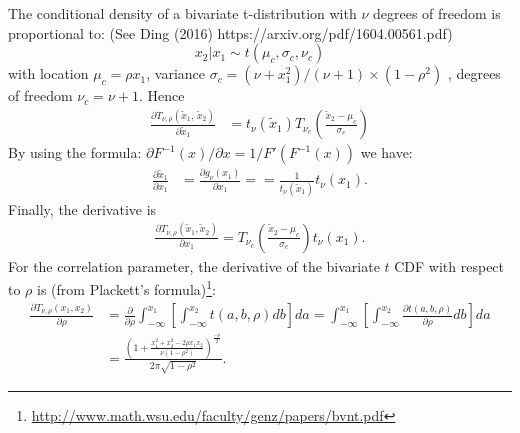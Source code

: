 \documentclass[a4paper,fleqn]{article}
\begin{document}
The conditional density of a bivariate t-distribution with $\nu$ degrees of freedom is proportional to: (See Ding (2016) https://arxiv.org/pdf/1604.00561.pdf)
$$ x_2|x_1 \sim t(\mu_c, \sigma_c , \nu_c)$$
with location $\mu_c = \rho x_1$, variance $\sigma_c = (\nu + x_1^2)/(\nu + 1) \times (1 - \rho^2)$ , degrees of freedom $\nu_c=\nu + 1$. Hence
\begin{align*}
   \frac{\partial T_{\nu, \rho}(\tilde x_1,\,\tilde x_2)}{\partial \tilde x_1}  & = t_\nu(\tilde x_1)   T_{\nu_c}\left(\frac{\tilde x_2 - \mu_c}{\sigma_c}\right)
\end{align*}
By using the formula: $\partial F^{-1}(x)/ \partial x = 1/F'(F^{-1}(x))$ we have:
\begin{align*}
\frac{\partial \tilde x_1}{\partial x_1} & =   \frac{\partial g_\nu(x_1) }{\partial x_1} =
   = \frac{1}{t_\nu(\tilde x_1)}t_\nu(x_1).
\end{align*}
Finally, the derivative is
\begin{align*}
 \frac{\partial T_{\nu, \rho}(\tilde x_1, \tilde x_2)}{\partial x_1}=   T_{\nu_c}\left(\frac{\tilde x_2 - \mu_c}{\sigma_c}\right)t_\nu(x_1).
\end{align*}
For the correlation parameter, the derivative of the bivariate $t$ CDF with respect to $\rho$ is (from Plackett's formula)\footnote{\url{http://www.math.wsu.edu/faculty/genz/papers/bvnt.pdf}}:
\begin{align*}
  \frac{\partial T_{\nu,\rho}(x_1, x_2)}{\partial\rho} &=  \frac{\partial}{\partial\rho} \int_{-\infty}^{x_1}\left[\int_{-\infty}^{x_2} t(a,b,\rho)db\right]da= \int_{-\infty}^{x_1}\left[\int_{-\infty}^{x_2} \frac{\partial t(a,b,\rho)}{\partial\rho}db\right]da \\
  & = \frac{\left(1 + \frac{x_1^2 + x_2^2 - 2\rho x_1x_2}{\nu(1-\rho^2)} \right)^\frac{-\nu}{2}}{2\pi\sqrt{1-\rho^2}}.
\end{align*}
\end{document}
